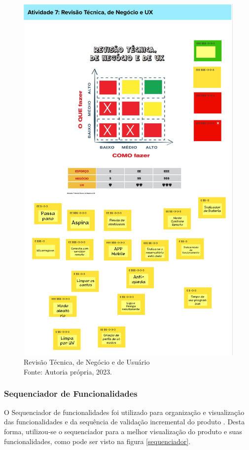 \begin{figure}[H]
\centering
\includegraphics[height=0.7\textheight]{figuras/Lean Inception/Mural - Revisão Técnica, de Negócio e de UX.png}
\caption{Revisão Técnica, de Negócio e de Usuário \\ Fonte: Autoria própria, 2023.}
\label{revisao}
\end{figure}
 

\subsubsection{Sequenciador de Funcionalidades}
O Sequenciador de funcionalidades foi utilizado para organização e visualização das funcionalidades e da sequência de validação incremental do produto \cite{caroli}. Desta forma, utilizou-se o sequenciador para a melhor visualização do produto e suas funcionalidades, como pode ser visto na figura \ref{sequenciador}.

